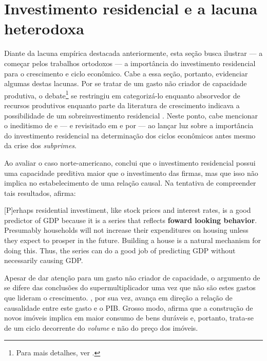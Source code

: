 \section{Investimento residencial e a lacuna heterodoxa}
\label{Secao_Residencial}

Diante da lacuna empírica destacada anteriormente, esta seção busca ilustrar --- a começar pelos trabalhos ortodoxos --- a importância do investimento residencial para o crescimento e ciclo econômico. 
Cabe a essa seção, portanto, evidenciar algumas destas lacunas.
Por se tratar de um gasto não criador de capacidade produtiva, o debate\footnote{Para mais detalhes, ver \textcite{arku_housing_2006}.} se restringiu em categorizá-lo enquanto absorvedor de recursos produtivos \cite{solow_importance_1995} enquanto parte da literatura de crescimento indicava  a possibilidade de um sobreinvestimento residencial \cite{mills_has_1987}. Neste ponto, cabe mencionar o ineditismo de \textcite{green_follow_1997} e \textcite{leamer_housing_2007} --- e revisitado em \textcite{leamer_housing_2015} e por \textcite{fiebiger_trend_2017} --- ao lançar luz sobre a importância do investimento residencial na determinação dos ciclos econômicos antes mesmo da crise dos \textit{subprimes}. 

  


Ao avaliar o caso norte-americano, \textcite{green_follow_1997} conclui que o investimento residencial possui uma capacidade preditiva maior que o investimento das firmas, mas que isso não implica no estabelecimento de uma relação causal. Na tentativa de compreender tais resultados, afirma:

\begin{citacao}

[P]erhaps residential investiment, like stock prices and interest rates, is a good predictor of GDP because it is a series that reflects \textbf{foward looking behavior}. Presumably households will not increase their expenditures on housing unless they expect to prosper in the future. Building a house is a natural mechanism for doing this. Thus, the series can do a good job of predicting GDP without necessarily causing GDP.
\cite[p.~267, grifos adicionados]{green_follow_1997}
\end{citacao}
Apesar de dar atenção para um gasto não criador de capacidade, o argumento de \textcite{green_follow_1997} se difere das conclusões do supermultiplicador uma vez que não são estes gastos que lideram o crescimento.
\textcite{leamer_housing_2007}, por sua vez, avança em direção a relação de causalidade entre este gasto e o PIB. Grosso modo, afirma que a construção de novos imóveis implica em maior consumo de bens duráveis e, portanto, trata-se de um ciclo decorrente do \textit{volume} e não do preço dos imóveis. 

